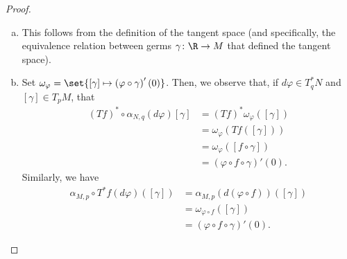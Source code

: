 \documentclass[10pt]{mypackage}
\begin{document}
\begin{proof}\hfill
  \begin{enumerate}[(a)]
    \item This follows from the definition of the tangent space (and specifically, the equivalence relation between germs $\gamma\colon \R\rightarrow M$ that defined the tangent space). 
    \item Set $\omega_{\varphi} = \set{\left[ \gamma \right]\mapsto \left( \varphi\circ \gamma \right)'\left( 0 \right)}$. Then, we observe that, if $d\varphi\in T_q^{\ast}N$ and $\left[ \gamma \right]\in T_{p}M$, that
      \begin{align*}
        \left( Tf \right)^{\ast}\circ \alpha_{N,q}\left( d\varphi \right)\left[ \gamma \right] &= \left( Tf \right)^{\ast} \omega_{\varphi}\left( \left[ \gamma \right] \right)\\
                                                                                               &= \omega_{\varphi}\left( Tf\left( \left[ \gamma \right] \right) \right)\\
                                                                                               &= \omega_{\varphi}\left( \left[ f\circ\gamma \right] \right)\\
                                                                                               &= \left( \varphi\circ f \circ \gamma \right)'(0).
      \end{align*}
      Similarly, we have
      \begin{align*}
        \alpha_{M,p}\circ T^{\ast}f\left( d\varphi \right)\left( \left[ \gamma \right] \right) &= \alpha_{M,p}\left( d\left( \varphi\circ f \right) \right) \left( \left[ \gamma \right] \right)\\
                                                                                               &= \omega_{\varphi\circ f}\left( \left[ \gamma \right] \right)\\
                                                                                               &= \left( \varphi\circ f \circ \gamma \right)'(0).
      \end{align*}
  \end{enumerate}
\end{proof}
\end{document}
